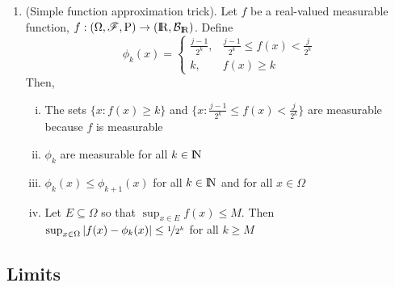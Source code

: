 \documentclass[a4paper,10pt]{article}
\begin{document}
\begin{enumerate}
  \item (Simple function approximation trick).         
        Let $f$ be a real-valued measurable function, $f:\ofp\to(\Re,\mathcal{B}_\Re)$. Define
        \[
         \phi_k(x) = \begin{cases}
                   \frac{j-1}{2^k},   &\frac{j-1}{2^k}\leq f(x) < \frac{j}{2^k}\\
                   k,                 &f(x) \geq k 
                  \end{cases}
        \]
        Then,
        \begin{enumerate}[i.]
         \item The sets $\{x: f(x) \geq k\}$ and $\{x: \frac{j-1}{2^k}\leq f(x) < \frac{j}{2^k}\}$ are measurable because $f$ is measurable
         \item $\phi_k$ are measurable for all $k\in\N$
         \item $\phi_k(x) \leq \phi_{k+1}(x)$ for all $k\in\N$ and for all $x\in\Omega$
         \item Let $E\subseteq \Omega$ so that $\sup_{x\in E}f(x) \leq M$. Then $\sup_{x\in\Omega}|f(x) - \phi_k(x)|\leq \nicefrac{1}{2^k}$ for all $k\geq M$
        \end{enumerate}

\end{enumerate}

\subsection{Limits}
\end{document}
